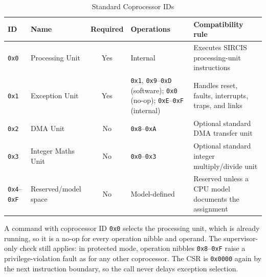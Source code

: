 \begin{table}[H]
	\centering
	\small
	\begin{tabularx}{\textwidth}{llcXX}
		\toprule
		\textbf{ID}                & \textbf{Name}        & \textbf{Required} & \textbf{Operations}                                                                                              & \textbf{Compatibility rule}                          \\
		\midrule
		\texttt{0x0}               & Processing Unit      & Yes               & Internal                                                                                                         & Executes SIRCIS processing-unit instructions         \\
		\texttt{0x1}               & Exception Unit       & Yes               & \texttt{0x1}, \texttt{0x9}--\texttt{0xD} (software); \texttt{0x0} (no-op); \texttt{0xE}--\texttt{0xF} (internal) & Handles reset, faults, interrupts, traps, and links  \\
		\texttt{0x2}               & DMA Unit             & No                & \texttt{0x8}--\texttt{0xA}                                                                                       & Optional standard DMA transfer unit                  \\
		\texttt{0x3}               & Integer Maths Unit   & No                & \texttt{0x0}--\texttt{0x3}                                                                                       & Optional standard integer multiply/divide unit       \\
		\texttt{0x4}--\texttt{0xF} & Reserved/model space & No                & Model-defined                                                                                                    & Reserved unless a CPU model documents the assignment \\
		\bottomrule
	\end{tabularx}
	\caption{Standard Coprocessor IDs}
	\label{tab:standard-coprocessor-ids}
\end{table}

\noindent A command with coprocessor ID \texttt{0x0} selects the processing unit, which is already running, so it is a no-op for
every operation nibble and operand. The supervisor-only check still applies: in protected mode, operation nibbles
\texttt{0x8}--\texttt{0xF} raise a privilege-violation fault as for any other coprocessor. The CSR is \texttt{0x0000} again by the next
instruction boundary, so the call never delays exception selection.

